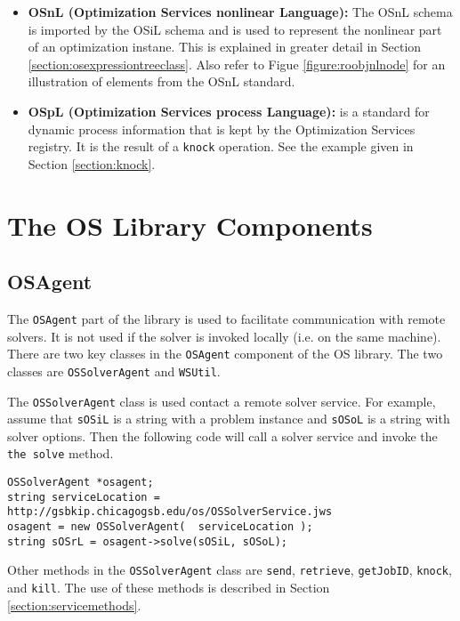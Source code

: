 \documentclass[11pt]{article}
\newcounter{Fig}
\renewcommand{\_}{{\char"5F}}
\renewcommand{\{}{{\char"7B}}
\renewcommand{\}}{{\char"7D}}
\renewcommand{\^}{{\char"0D}}
\renewcommand{\'}{{\char"0D}}
\begin{document}
\begin{itemize}
\item[] {\bf OSnL (Optimization Services nonlinear Language):}  The OSnL schema is imported by the OSiL schema and is used to represent the nonlinear part of an optimization instane. This is explained in greater detail in Section \ref{section:osexpressiontreeclass}. Also refer to Figue \ref{figure:roobjnlnode} for an illustration of elements from the OSnL standard.



\item[]   {\bf OSpL (Optimization Services process Language):} is a standard for dynamic process information that is kept by the Optimization Services registry.
It is the result of a {\tt knock} operation. See the example given in Section \ref{section:knock}.

\end{itemize}




\section{The OS Library Components}\label{section:oslibrary}

\subsection{OSAgent}\label{section:osagent}

The {\tt OSAgent}  part of the library is used to facilitate communication with remote solvers. It is not used if the solver is invoked locally (i.e. on the same machine).   There are two key classes in the {\tt OSAgent} component of the OS library. The two classes are {\tt OSSolverAgent} and {\tt WSUtil}.

The {\tt OSSolverAgent} class is used  contact a remote solver service.  For example, assume that {\tt sOSiL} is a string with a problem instance and {\tt sOSoL} is a string with solver options. Then the following code will call a solver service and invoke the {\tt the solve} method.
\begin{verbatim}
OSSolverAgent *osagent;
string serviceLocation = http://gsbkip.chicagogsb.edu/os/OSSolverService.jws
osagent = new OSSolverAgent(  serviceLocation );
string sOSrL = osagent->solve(sOSiL, sOSoL);
\end{verbatim}
Other methods in the {\tt OSSolverAgent} class are {\tt send}, {\tt retrieve}, {\tt getJobID}, {\tt knock}, and {\tt kill}.  The use of these methods is described in Section \ref{section:servicemethods}.
\end{document}
